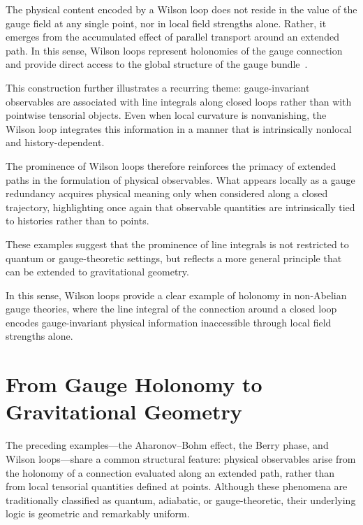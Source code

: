 \documentclass[%
 reprint,
 amsmath,amssymb,
 aps,
 prb,
]{revtex4-2}
\numberwithin{equation}{section}
\begin{document}
The physical content encoded by a Wilson loop does not reside in the value of the gauge field at any single point, nor in local field strengths alone. Rather, it emerges from the accumulated effect of parallel transport around an extended path. In this sense, Wilson loops represent holonomies of the gauge connection and provide direct access to the global structure of the gauge bundle~\cite{Nakahara2003}.

This construction further illustrates a recurring theme: gauge-invariant observables are associated with line integrals along closed loops rather than with pointwise tensorial objects. Even when local curvature is nonvanishing, the Wilson loop integrates this information in a manner that is intrinsically nonlocal and history-dependent.

The prominence of Wilson loops therefore reinforces the primacy of extended paths in the formulation of physical observables. What appears locally as a gauge redundancy acquires physical meaning only when considered along a closed trajectory, highlighting once again that observable quantities are intrinsically tied to histories rather than to points.

These examples suggest that the prominence of line integrals is not restricted to quantum or gauge-theoretic settings, but reflects a more general principle that can be extended to gravitational geometry.

In this sense, Wilson loops provide a clear example of holonomy in non-Abelian gauge theories, where the line integral of the connection around a closed loop encodes gauge-invariant physical information inaccessible through local field strengths alone.


\section{From Gauge Holonomy to Gravitational Geometry}
\label{sec:gauge_to_gravity}

The preceding examples---the Aharonov--Bohm effect, the Berry phase, and Wilson loops---share a common structural feature: physical observables arise from the holonomy of a connection evaluated along an extended path, rather than from local tensorial quantities defined at points. Although these phenomena are traditionally classified as quantum, adiabatic, or gauge-theoretic, their underlying logic is geometric and remarkably uniform.
\end{document}
